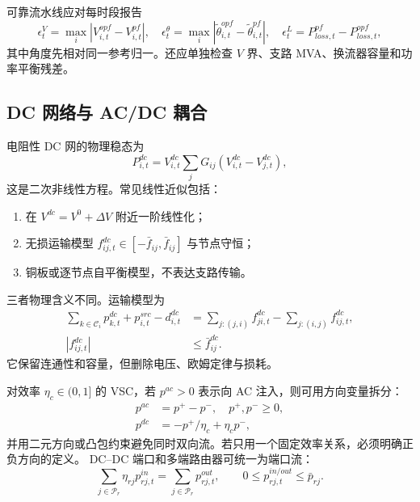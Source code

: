 可靠流水线应对每时段报告
\begin{equation}
\epsilon_t^V=\max_i|V_{i,t}^{opf}-V_{i,t}^{pf}|,\quad
\epsilon_t^\theta=\max_i|\tilde\theta_{i,t}^{opf}-\tilde\theta_{i,t}^{pf}|,
\quad\epsilon_t^L=P_{loss,t}^{pf}-P_{loss,t}^{opf},\label{eq:ts-crossval}
\end{equation}
其中角度先相对同一参考归一。还应单独检查 $V$ 界、支路 MVA、换流器容量和功率平衡残差。

\subsection{DC 网络与 AC/DC 耦合}
电阻性 DC 网的物理稳态为
\begin{equation}
P_{i,t}^{dc}=V_{i,t}^{dc}\sum_jG_{ij}(V_{i,t}^{dc}-V_{j,t}^{dc}),\label{eq:ts-dcphysical}
\end{equation}
这是二次非线性方程。常见线性近似包括：
\begin{enumerate}
\item 在 $V^{dc}=V^0+\Delta V$ 附近一阶线性化；
\item 无损运输模型 $f_{ij,t}^{dc}\in[-\bar f_{ij},\bar f_{ij}]$ 与节点守恒；
\item 铜板或逐节点自平衡模型，不表达支路传输。
\end{enumerate}
三者物理含义不同。运输模型为
\begin{align}
\sum_{k\in\mathcal C_i}p_{k,t}^{dc}+p_{i,t}^{src}-d_{i,t}^{dc}
&=\sum_{j:(j,i)}f_{ji,t}^{dc}-\sum_{j:(i,j)}f_{ij,t}^{dc},\label{eq:ts-dctransport}\\
|f_{ij,t}^{dc}|&\le\bar f_{ij}^{dc}.\label{eq:ts-dclimit}
\end{align}
它保留连通性和容量，但删除电压、欧姆定律与损耗。

对效率 $\eta_c\in(0,1]$ 的 VSC，若 $p^{ac}>0$ 表示向 AC 注入，则可用方向变量拆分：
\begin{align}
p^{ac}&=p^+-p^-,\quad p^+,p^-\ge0,\\
p^{dc}&=-p^+/\eta_c+\eta_c p^-,\label{eq:ts-vsc-eff}
\end{align}
并用二元方向或凸包约束避免同时双向流。若只用一个固定效率关系，必须明确正负方向的定义。
DC--DC 端口和多端路由器可统一为端口流：
\begin{equation}
\sum_{j\in\mathcal P_r}\eta_{rj}p_{rj,t}^{in}
=\sum_{j\in\mathcal P_r}p_{rj,t}^{out},\qquad
0\le p_{rj,t}^{in/out}\le\bar p_{rj}.\label{eq:ts-router}
\end{equation}

